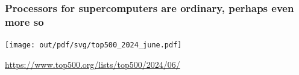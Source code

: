 \documentclass[12pt,dvipdfmx]{beamer}
\begin{document}
\begin{frame}
\frametitle{Processors for supercomputers are ordinary, perhaps even more so}
  \begin{center}
    \texttt{[image: out/pdf/svg/top500\_2024\_june.pdf]}

    \url{https://www.top500.org/lists/top500/2024/06/}
  \end{center}
\end{frame}

\end{document}
